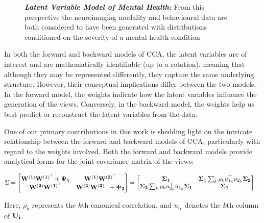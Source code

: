 \begin{figure}
    \centering
    \caption[Latent Variable Model of Mental Health]{\textit{\textbf{Latent Variable Model of Mental Health:}} From this perspective the neuroimaging modality and behavioural data are both considered to have been generated with distributions conditioned on the severity of a mental health condition}\label{fig:mentalhealthselfsupervised}
\end{figure}

In both the forward and backward models of CCA, the latent variables are of interest and are mathematically identifiable (up to a rotation), meaning that although they may be represented differently, they capture the same underlying structure.
However, their conceptual implications differ between the two models.
In the forward model, the weights indicate how the latent variables influence the generation of the views.
Conversely, in the backward model, the weights help us best predict or reconstruct the latent variables from the data.

One of our primary contributions in this work is shedding light on the intricate relationship between the forward and backward models of CCA, particularly with regard to the weights involved.
Both the forward and backward models provide analytical forms for the joint covariance matrix of the views:

\begin{align}
    \Sigma &= \begin{bmatrix}
        \bold{W^{(1)}W^{(1)^{\top}}} + \bold{\Psi_1} & \bold{W^{(1)}W^{(2)^{\top}}} \\
        \bold{W^{(2)}W^{(1)^{\top}}} & \bold{W^{(2)}W^{(2)^{\top}}} + \bold{\Psi_2}
    \end{bmatrix} = \begin{bmatrix}
        \bold{\Sigma_1} & \bold{\Sigma_1}\sum_k \rho_k u_{1_k}^\top u_{2_k} \bold{\Sigma_2}  \\
        \bold{\Sigma_2}\sum_k \rho_k u_{2_k}^\top u_{1_k} \bold{\Sigma_1} & \bold{\Sigma_1}
    \end{bmatrix}
\end{align}

Here, $\rho_k$ represents the $k$th canonical correlation, and $u_{i_k}$ denotes the $k$th column of $\bold{U_i}$.

